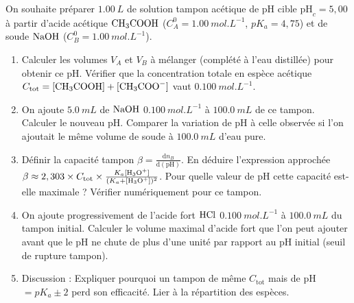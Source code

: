 \documentclass[11pt]{article}
\begin{document}
\begin{exercice}
On souhaite préparer $\SI{1,00}{L}$ de solution tampon acétique de pH cible $\text{pH}_c = 5,00$ à partir d'acide acétique $\ce{CH3COOH}$ ($C_A^0 = \SI{1,00}{mol.L^{-1}}$, $pK_a = 4,75$) et de soude $\ce{NaOH}$ ($C_B^0 = \SI{1,00}{mol.L^{-1}}$).
\begin{enumerate}
    \item Calculer les volumes $V_A$ et $V_B$ à mélanger (complété à l'eau distillée) pour obtenir ce pH. Vérifier que la concentration totale en espèce acétique $C_{\text{tot}} = [\ce{CH3COOH}] + [\ce{CH3COO-}]$ vaut $\SI{0,100}{mol.L^{-1}}$.
    \item On ajoute $\SI{5,0}{mL}$ de $\ce{NaOH}$ $\SI{0,100}{mol.L^{-1}}$ à $\SI{100,0}{mL}$ de ce tampon. Calculer le nouveau pH. Comparer la variation de pH à celle observée si l'on ajoutait le même volume de soude à $\SI{100,0}{mL}$ d'eau pure.
    \item Définir la capacité tampon $\beta = \frac{\text{d}n_B}{\text{d}(\text{pH})}$. En déduire l'expression approchée $\beta \approx 2,303 \times C_{\text{tot}} \times \frac{K_a[\ce{H3O+}]}{(K_a+[\ce{H3O+}])^2}$. Pour quelle valeur de $\text{pH}$ cette capacité est-elle maximale ? Vérifier numériquement pour ce tampon.
    \item On ajoute progressivement de l'acide fort $\ce{HCl}$ $\SI{0,100}{mol.L^{-1}}$ à $\SI{100,0}{mL}$ du tampon initial. Calculer le volume maximal d'acide fort que l'on peut ajouter avant que le pH ne chute de plus d'une unité par rapport au pH initial (seuil de rupture tampon).
    \item Discussion : Expliquer pourquoi un tampon de même $C_{\text{tot}}$ mais de pH $= pK_a \pm 2$ perd son efficacité. Lier à la répartition des espèces.
\end{enumerate}
\end{exercice}
\end{document}
